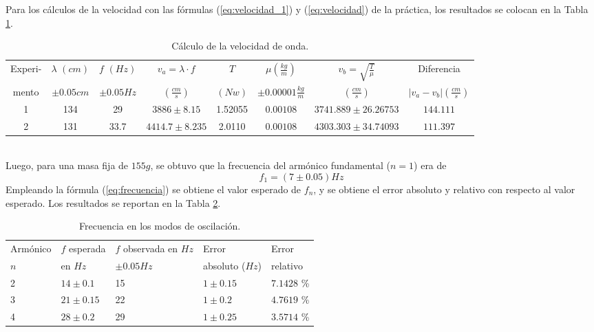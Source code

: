 \documentclass[10pt,a4paper]{article}
\begin{document}
Para los cálculos de la velocidad con las fórmulas (\ref{eq:velocidad_1}) y (\ref{eq:velocidad}) de la práctica, los resultados se colocan en la Tabla \ref{tab:segunda}.\vspace{-5mm}
\begin{table}[ht]
	\small 
\centering
\caption{Cálculo de la velocidad de onda.}
	\begin{tabular}{|c|c|c|c|c|c|c|c|}
		\hline
		Experi-& $ \lambda $ $ (cm)$ & $ f $ $ (Hz)$ & $ v_a=\lambda\cdot f $ & $ T $ & $ \mu  (\frac{kg}{m})$ & $ v_b=\sqrt{\frac{T}{\mu}} $ & Diferencia \\
		mento & $ \pm 0.05cm $ & $ \pm 0.05 Hz $ & $ (\frac{cm}{s}) $ & $ (Nw) $ & $ \pm 0.00001\frac{kg}{m} $ & $ (\frac{cm}{s}) $ & $ |v_a-v_b| (\frac{cm}{s}) $ \\ 		\hline
		1 & 134 & 29 & $ 3886\pm8.15 $ & 1.52055 & $0.00108$ & $ 3741.889\pm 26.26753 $ & $ 144.111 $ \\ 		\hline
		2 & 131 & 33.7 & $ 4414.7\pm8.235 $ & 2.0110 & $0.00108$ & $ 4303.303\pm 34.74093 $ & $ 111.397 $ \\ 		\hline
	\end{tabular}
	\label{tab:segunda}
\end{table}\\
Luego, para una masa fija de $ 155g $, se obtuvo que la frecuencia del armónico fundamental ($ n=1 $) era de $$f_1=(7\pm0.05)Hz$$
Empleando la fórmula (\ref{eq:frecuencia}) se obtiene el valor esperado de \(f_n\), y se obtiene el error absoluto y relativo con respecto al valor esperado. Los resultados se reportan en la Tabla \ref{tab:tercera}.\vspace{-5mm}
\begin{table}[hbt!]
	\centering
	\caption{Frecuencia en los modos de oscilación.}
	\begin{tabular}{|l|l|l|l|l|}
		\hline
		Armónico & $ f $ esperada & $ f $ observada en $Hz$  & Error &Error  \\
		$ n $ & en $ Hz $ & $\pm 0.05 Hz $ & absoluto (\(Hz\)) & relativo\\  		\hline
		2 & $ 14 \pm 0.1$ & 15 & $ 1\pm 0.15 $ & $7.1428$ \textsc{\%}\\ 		\hline
		3 & $ 21 \pm 0.15$ & 22 & $ 1\pm 0.2 $ & $4.7619$ \textsc{\%}\\  		\hline
		4 & $ 28 \pm 0.2$ & 29 & $ 1\pm 0.25$ & $3.5714$ \textsc{\%}\\ 		\hline
	\end{tabular}
	\label{tab:tercera}
\end{table}\\
\end{document}
